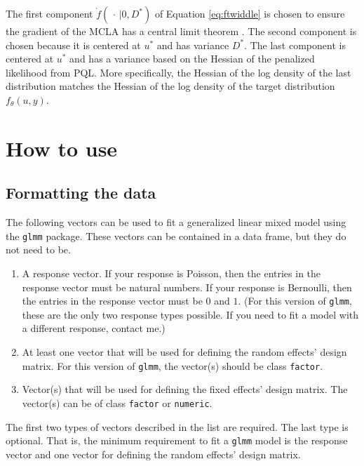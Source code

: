 \documentclass[article]{jss}
\begin{document}
The first component  $\grave{f}( \,  \cdot \, | 0, D^*)$ of Equation \ref{eq:ftwiddle}  is chosen to ensure  the gradient of the MCLA has a central limit theorem \citep{mythesis}.  The second component is chosen because it is centered at  $u^*$ and  has  variance $D^*$. The last component is centered at $u^*$ and has a variance based on the Hessian of the  penalized likelihood from PQL.  More specifically, the Hessian of the log density of the last distribution matches the Hessian of the log density of the target distribution $f_\theta(u,y)$. 





\section[How to use glmm]{How to use }\label{sec:howto}


\subsection{Formatting the data}

The following vectors can be used to fit a generalized linear mixed model using the \texttt{glmm} package. These vectors can be contained in a data frame, but they do not need to be.
\begin{enumerate}
\item A response vector. If your response is Poisson, then the entries in the response vector must be natural numbers. If your response is Bernoulli, then the entries in the response vector must be $0$ and $1$. (For this version of \texttt{glmm}, these are the only two response types possible. If you need to fit a model with a different response, contact me.) 
\item At least one vector that will be used for defining the random effects' design matrix. For this version of \texttt{glmm}, the vector(s) should be class \texttt{factor}.
\item Vector(s) that will be used for defining the fixed effects' design matrix. The vector(s) can be of class \texttt{factor} or \texttt{numeric}. 
\end{enumerate}
The first two types of vectors described in the list are required. The last type is optional. That is, the minimum requirement to fit a \texttt{glmm} model is the response vector and one vector for defining the random effects' design matrix. \\
\end{document}
